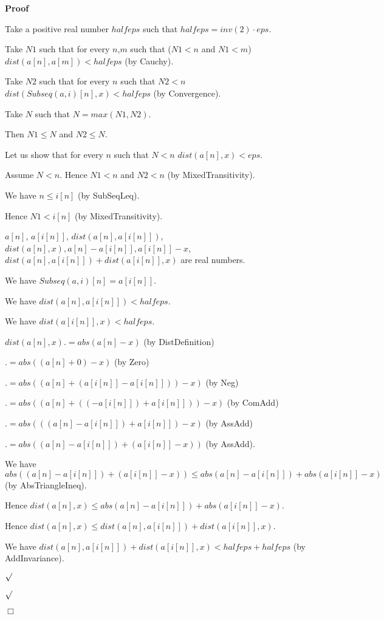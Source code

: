 \documentclass{article}
\newenvironment{forthel}{\begin{leftbar}}{\end{leftbar}}
\newenvironment{proof}{\noindent\textbf{Proof\ }}{\hspace*{\fill}$\Box$\medskip}
\newenvironment{subproof}{\begin{list}{}{}
		\item[\text{Proof}]}{\hfill $\surd$ \end{list}}
\begin{document}
\begin{forthel}
\begin{proof}
\begin{subproof}
			Take a positive real number $halfeps$ such that $halfeps = inv(2) \cdot eps$.
			
			Take $N1$ such that for every $n$,$m$ such that ($N1 < n$ and $N1 < m$) $dist(a[n],a[m]) < halfeps$ (by Cauchy).
			
			Take $N2$ such that for every $n$ such that $N2 < n$ $dist(Subseq(a,i)[n],x) < halfeps$ (by Convergence).
			
			Take $N$ such that $N = max(N1,N2)$.
			
			Then $N1 \leq N$ and $N2 \leq N$.
			
			Let us show that for every $n$ such that $N < n$ $dist(a[n],x) < eps$.
			
			\begin{subproof}
				Assume $N < n$. Hence $N1 < n$ and $N2 < n$ (by MixedTransitivity).
				
				We have $n \leq i[n]$ (by SubSeqLeq).
				
				Hence $N1 < i[n]$ (by MixedTransitivity).
				
				$a[n]$, $a[i[n]]$, $dist(a[n],a[i[n]])$, $dist(a[n],x), a[n] - a[i[n]], a[i[n]] - x$, $dist(a[n],a[i[n]]) + dist(a[i[n]],x)$ are real numbers.
				
				We have $Subseq(a,i)[n] = a[i[n]]$.
				
				We have $dist(a[n],a[i[n]]) < halfeps$.
				
				We have $dist(a[i[n]],x) < halfeps$.
				
				$dist(a[n],x) .= abs(a[n] - x)$ (by DistDefinition)
				
				$.= abs((a[n] + 0) - x)$ (by Zero)
				
				$.= abs((a[n] + (a[i[n]] - a[i[n]])) - x)$ (by Neg)
				
				$.= abs((a[n] + ((-a[i[n]]) + a[i[n]])) - x)$ (by ComAdd)
				
				$.= abs(((a[n] - a[i[n]]) + a[i[n]]) - x)$ (by AssAdd)
				
				$.= abs((a[n] - a[i[n]]) + (a[i[n]] - x))$ (by AssAdd).
				
				We have $abs((a[n] - a[i[n]]) + (a[i[n]] - x)) \leq abs(a[n] - a[i[n]]) + abs(a[i[n]] - x)$ (by AbsTriangleIneq).
				
				Hence $dist(a[n],x) \leq abs(a[n] - a[i[n]]) + abs(a[i[n]] - x)$.
				
				Hence $dist(a[n],x) \leq dist(a[n],a[i[n]]) + dist(a[i[n]],x)$.
				
				We have $dist(a[n],a[i[n]]) + dist(a[i[n]],x) < halfeps + halfeps$ (by AddInvariance).
				

\end{subproof}
\end{subproof}
\end{proof}
\end{forthel}
\end{document}
